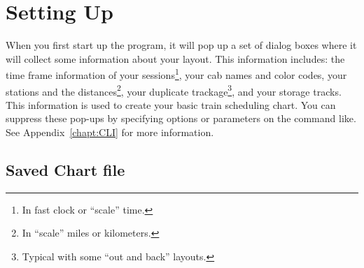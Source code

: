 
\chapter{Setting Up}
\label{chapt:SettingUp}

When you first start up the program, it will pop up a set of dialog
boxes where it will collect some information about your layout.  This
information includes: the time frame information of your
sessions\footnote{In fast clock or ``scale'' time.}, your cab names and
color codes, your stations and the distances\footnote{In ``scale'' miles
or kilometers.}, your duplicate trackage\footnote{Typical with some
``out and back'' layouts.}, and your storage tracks.  This information
is used to create your basic train scheduling chart.  You can suppress these
pop-ups by specifying options or parameters on the command like.  See
Appendix~\ref{chapt:CLI} for more information.

\section{Saved Chart file}

